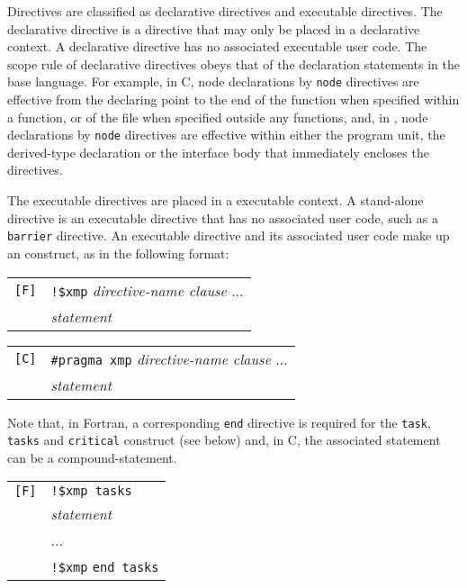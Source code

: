 Directives are classified as declarative directives and executable
directives. The declarative directive is a directive that may only be
placed in a declarative context. A declarative directive has no
associated executable user code. The scope rule of declarative
directives obeys that of the declaration statements in the base
language. For example, in C, node declarations by {\tt node} directives
are effective from the declaring point to the end of the function when
specified within a function, or of the file when specified outside any
functions, and, in {\Fort}, node declarations by {\tt node} directives
are effective within either the program unit, the derived-type
declaration or the interface body that immediately encloses the
directives.

The executable directives are placed in a executable context. A
stand-alone directive is an executable directive that has no associated
user code, such as a {\tt barrier} directive.
%
An executable directive and its associated user code make up an
{\XMP} construct, as in the following format:

\vspace{0.5cm}

\begin{tabular}{ll}
\verb![F]! & \verb|!$xmp| {\it directive-name clause} ...\\
 & \hspace{0.5cm} {\it statement} \\
\end{tabular}

\vspace{0.3cm}

\begin{tabular}{ll}
\verb![C]! & \verb|#pragma xmp| {\it directive-name clause} ...\\
 & \hspace{0.5cm} {\it statement} \\
\end{tabular}

\vspace{0.5cm}

Note that, in Fortran, a corresponding {\tt end} directive is required
for the {\tt task}, {\tt tasks} and {\tt critical} construct (see below)
and, in C, the associated statement can be a compound-statement.

\vspace{0.5cm}

\begin{tabular}{ll}
\verb![F]! & \verb|!$xmp tasks| \\
 & \hspace{0.5cm} {\it statement} \\
 & \hspace{0.5cm} ... \\
 & \verb|!$xmp| {\tt end tasks}\\
\end{tabular}






